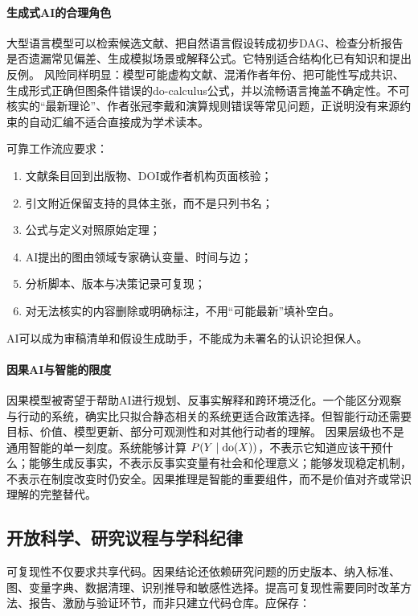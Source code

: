 \paragraph{生成式AI的合理角色}

大型语言模型可以检索候选文献、把自然语言假设转成初步DAG、检查分析报告是否遗漏常见偏差、生成模拟场景或解释公式。它特别适合结构化已有知识和提出反例。
风险同样明显：模型可能虚构文献、混淆作者年份、把可能性写成共识、生成形式正确但图条件错误的do-calculus公式，并以流畅语言掩盖不确定性。不可核实的“最新理论”、作者张冠李戴和演算规则错误等常见问题，正说明没有来源约束的自动汇编不适合直接成为学术读本。

可靠工作流应要求：

\begin{enumerate}
  \item 文献条目回到出版物、DOI或作者机构页面核验；
  \item 引文附近保留支持的具体主张，而不是只列书名；
  \item 公式与定义对照原始定理；
  \item AI提出的图由领域专家确认变量、时间与边；
  \item 分析脚本、版本与决策记录可复现；
  \item 对无法核实的内容删除或明确标注，不用“可能最新”填补空白。
\end{enumerate}

AI可以成为审稿清单和假设生成助手，不能成为未署名的认识论担保人。

\paragraph{因果AI与智能的限度}

因果模型被寄望于帮助AI进行规划、反事实解释和跨环境泛化。一个能区分观察与行动的系统，确实比只拟合静态相关的系统更适合政策选择。但智能行动还需要目标、价值、模型更新、部分可观测性和对其他行动者的理解。
因果层级也不是通用智能的单一刻度。系统能够计算 $P(Y\mid\operatorname{do}(X))$，不表示它知道应该干预什么；能够生成反事实，不表示反事实变量有社会和伦理意义；能够发现稳定机制，不表示在制度改变时仍安全。因果推理是智能的重要组件，而不是价值对齐或常识理解的完整替代。

\subsection{开放科学、研究议程与学科纪律}

可复现性不仅要求共享代码。因果结论还依赖研究问题的历史版本、纳入标准、图、变量字典、数据清理、识别推导和敏感性选择。提高可复现性需要同时改革方法、报告、激励与验证环节，而非只建立代码仓库\parencite{munafo2017}。应保存：

